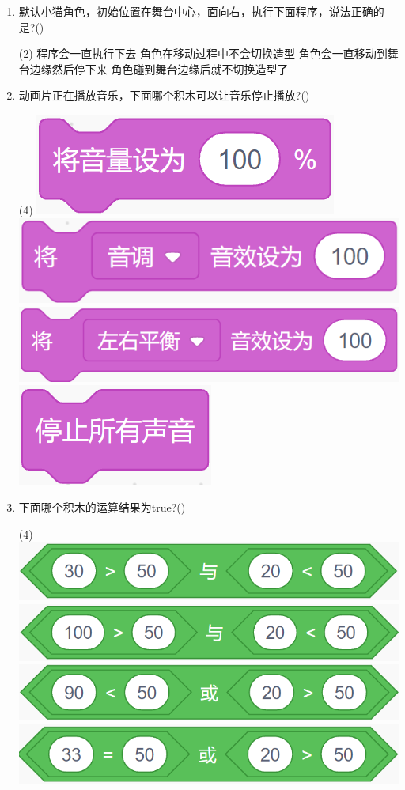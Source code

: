 \documentclass[10pt, a4paper]{article}
\begin{document}
\begin{enumerate}
        \item 默认小猫角色，初始位置在舞台中心，面向右，执行下面程序，说法正确的是?(\qquad)
        \begin{tasks}(2)
            \task 程序会一直执行下去
            \task 角色在移动过程中不会切换造型
            \task 角色会一直移动到舞台边缘然后停下来
            \task 角色碰到舞台边缘后就不切换造型了
        \end{tasks}

        \item 动画片正在播放音乐，下面哪个积木可以让音乐停止播放?(\qquad)
        \begin{tasks}(4)
            \task \includegraphics[width=.12\textwidth]{24a.png}
            \task \includegraphics[width=.18\textwidth]{24b.png}
            \task \includegraphics[width=.18\textwidth]{24c.png}
            \task \includegraphics[width=.08\textwidth]{24d.png}
        \end{tasks}

        \item 下面哪个积木的运算结果为true?(\qquad)
        \begin{tasks}(4)
            \task \includegraphics[width=.18\textwidth]{25a.png}
            \task \includegraphics[width=.18\textwidth]{25b.png}
            \task \includegraphics[width=.18\textwidth]{25c.png}
            \task \includegraphics[width=.18\textwidth]{25d.png}
        \end{tasks}


\end{enumerate}
\end{document}
